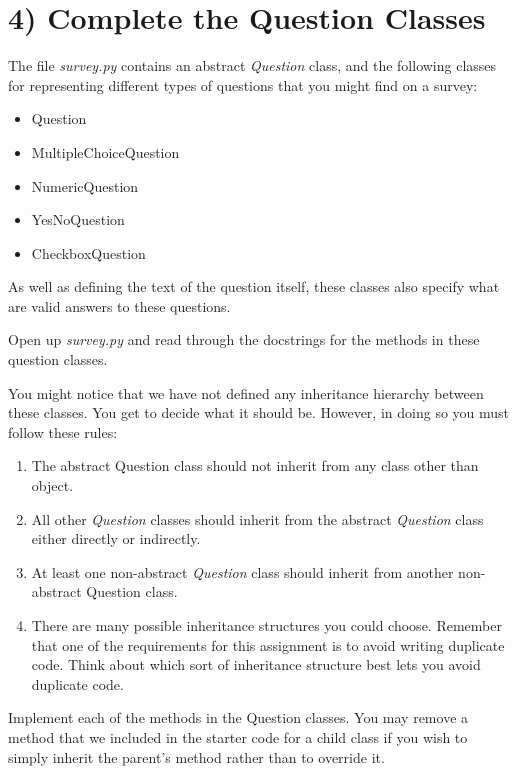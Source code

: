 \documentclass[12pt]{article}
\begin{document}
\section*{4) Complete the Question Classes}
The file \textit{survey.py} contains an abstract \textit{Question} class, and the following classes
for representing different types of questions that you might find on a survey:

\begin{itemize}
    \item Question
    \item MultipleChoiceQuestion
    \item NumericQuestion
    \item YesNoQuestion
    \item CheckboxQuestion
\end{itemize}

\bigskip

\noindent As well as defining the text of the question itself, these classes also specify
what are valid answers to these questions.

\bigskip

\noindent Open up \textit{survey.py} and read through the docstrings for the methods in
these question classes.

\bigskip

You might notice that we have not defined any inheritance hierarchy between these
classes. You get to decide what it should be. However, in doing so you must follow
these rules:

\begin{enumerate}[1.]
    \item The abstract Question class should not inherit from any class other than
    object.
    \item All other \textit{Question} classes should inherit from the abstract
    \textit{Question} class either directly or indirectly.
    \item At least one non-abstract \textit{Question} class should inherit from another
    non-abstract Question class.
    \item There are many possible inheritance structures you could choose.
    Remember that one of the requirements for this assignment is to avoid
    writing duplicate code. Think about which sort of inheritance structure
    best lets you avoid duplicate code.
\end{enumerate}

\bigskip

\noindent Implement each of the methods in the Question classes. You may remove a method
that we included in the starter code for a child class if you wish to simply
inherit the parent’s method rather than to override it.
\end{document}
